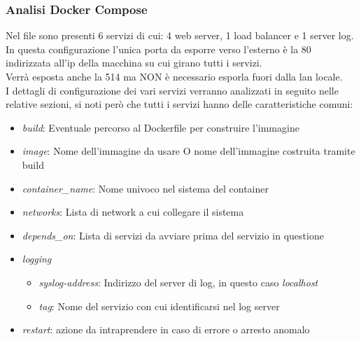 \documentclass[../DocumentazioneProgetto.tex]{subfiles}
\begin{document}
	\subsubsection{Analisi Docker Compose}
	Nel file sono presenti 6 servizi di cui: 4 web server, 1 load balancer e 1 server log.\\
	In questa configurazione l'unica porta da esporre verso l'esterno è la 80 indirizzata all'ip della macchina su cui girano tutti i servizi.\\
	Verrà esposta anche la 514 ma NON è necessario esporla fuori dalla lan locale.\\
	I dettagli di configurazione dei vari servizi verranno analizzati in seguito nelle relative sezioni, si noti però
	che tutti i servizi hanno delle caratteristiche comuni:
	\begin{itemize}
		\item \textit{build}: Eventuale percorso al Dockerfile per construire l'immagine
		\item \textit{image}: Nome dell'immagine da usare O nome dell'immagine costruita tramite build
		\item \textit{container\_name}: Nome univoco nel sistema del container
		\item \textit{networks}: Lista di network a cui collegare il sistema
		\item \textit{depends\_on}: Lista di servizi da avviare prima del servizio in questione
		\item \textit{logging}
		\begin{itemize}
			\item \textit{syslog-address}: Indirizzo del server di log, in questo caso \textit{localhost} 
			\item \textit{tag}: Nome del servizio con cui identificarsi nel log server
		\end{itemize}
		\item \textit{restart}: azione da intraprendere in caso di errore o arresto anomalo
	\end{itemize}


\end{document}
